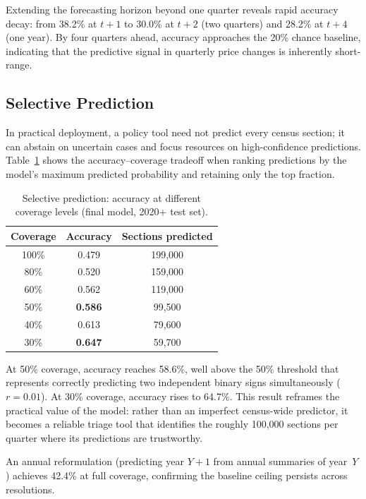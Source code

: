 \documentclass[12pt,a4paper]{article}
\begin{document}
Extending the forecasting horizon beyond one quarter reveals rapid accuracy decay: from 38.2\% at $t{+}1$ to 30.0\% at $t{+}2$ (two quarters) and 28.2\% at $t{+}4$ (one year). By four quarters ahead, accuracy approaches the 20\% chance baseline, indicating that the predictive signal in quarterly price changes is inherently short-range.

\subsection{Selective Prediction}

In practical deployment, a policy tool need not predict every census section; it can abstain on uncertain cases and focus resources on high-confidence predictions. Table~\ref{tab:selective} shows the accuracy--coverage tradeoff when ranking predictions by the model's maximum predicted probability and retaining only the top fraction.

\begin{table}[H]
\centering
\caption{Selective prediction: accuracy at different coverage levels (final model, 2020+ test set).}
\label{tab:selective}
\begin{tabular}{ccc}
\toprule
\textbf{Coverage} & \textbf{Accuracy} & \textbf{Sections predicted} \\
\midrule
100\% & 0.479 & 199,000 \\
80\% & 0.520 & 159,000 \\
60\% & 0.562 & 119,000 \\
50\% & \textbf{0.586} & 99,500 \\
40\% & 0.613 & 79,600 \\
30\% & \textbf{0.647} & 59,700 \\
\bottomrule
\end{tabular}
\end{table}

At 50\% coverage, accuracy reaches 58.6\%, well above the 50\% threshold that represents correctly predicting two independent binary signs simultaneously ($r = 0.01$). At 30\% coverage, accuracy rises to 64.7\%. This result reframes the practical value of the model: rather than an imperfect census-wide predictor, it becomes a reliable triage tool that identifies the roughly 100,000 sections per quarter where its predictions are trustworthy.

An annual reformulation (predicting year $Y{+}1$ from annual summaries of year~$Y$) achieves 42.4\% at full coverage, confirming the baseline ceiling persists across resolutions.
\end{document}
